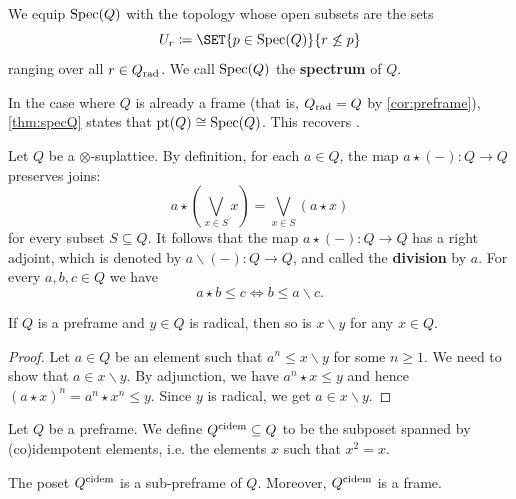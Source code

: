\documentclass[10pt,a4paper,oneside]{article}
\begin{document}
\begin{de}\label{def:spec-q}
We equip $\operatorname{Spec}(Q)$ with the topology whose open subsets are the sets
\[
U_r \coloneqq \SET{p\in \spec(Q)}{r\not\le p}
\]
ranging over all $r \in Q_{\operatorname{rad}}$. We call $\operatorname{Spec}(Q)$ the \textbf{spectrum} of $Q$.
\end{de}

\begin{rem}
In the case where $Q$ is already a frame (that is, $Q_{\operatorname{rad}}=Q$ by \cref{cor:preframe}), \cref{thm:specQ} states that $\operatorname{pt}(Q)\cong\operatorname{Spec}(Q)$. This recovers \cite[Proposition~II.1.3]{Johnstone82}.
\end{rem}
\begin{de}
Let $Q$ be a $\otimes$-suplattice. By definition, for each $a\in Q$, the map $a \star(-): Q \rightarrow Q$ preserves joins:
$$
a \star\left(\bigvee_{x \in S} x\right)=\bigvee_{x \in S} (a \star x)
$$
for every subset $S \subseteq Q$. It follows that the map $a \star(-): Q \rightarrow Q$ has a right adjoint, which is denoted by $a \backslash(-): Q \rightarrow Q$, and called the \textbf{division} by $a$. For every $a, b, c \in Q$ we have
$$
a \star b \leq c \iff b \leq a \backslash c .
$$
\end{de}
\begin{prop}\label{homradical}
If  $Q$ is a preframe and $y\in Q$ is radical, then so is $x\backslash y$ for any $x\in Q$.
\end{prop}
\begin{proof}
Let $a\in Q$ be an element such that $a^n \leq x\backslash y$ for some $n\geq1$. We need to show that $a \in x\backslash y$. By adjunction, we have $a^n\star x\leq y$ and hence $(a\star x)^n=a^n\star x^n\leq y$. Since $y$ is radical, we get $a \in x\backslash y$.
\end{proof}
\begin{de}
Let $Q$ be a preframe. We define $Q^{\operatorname{cidem}} \subseteq Q$ to be the subposet spanned by (co)idempotent elements, i.e. the elements $x$ such that $x^2=x$.
\end{de}
\begin{prop}
The poset $Q^{\operatorname{cidem}}$ is a sub-preframe of $Q$. Moreover, $Q^{\operatorname{cidem}}$ is a frame.
\end{prop}
\end{document}
